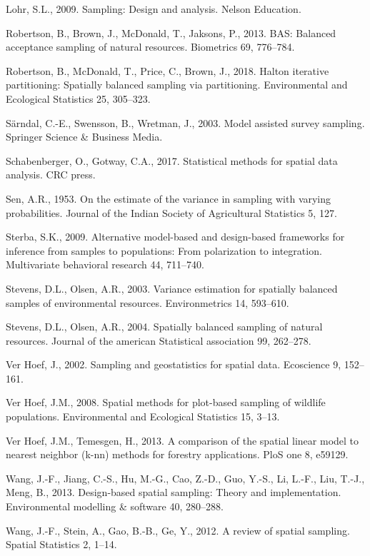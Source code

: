 \documentclass[]{elsarticle} %
\begin{document}
\leavevmode\hypertarget{ref-lohr2009sampling}{}%
Lohr, S.L., 2009. Sampling: Design and analysis. Nelson Education.

\leavevmode\hypertarget{ref-robertson2013bas}{}%
Robertson, B., Brown, J., McDonald, T., Jaksons, P., 2013. BAS: Balanced
acceptance sampling of natural resources. Biometrics 69, 776--784.

\leavevmode\hypertarget{ref-robertson2018halton}{}%
Robertson, B., McDonald, T., Price, C., Brown, J., 2018. Halton
iterative partitioning: Spatially balanced sampling via partitioning.
Environmental and Ecological Statistics 25, 305--323.

\leavevmode\hypertarget{ref-sarndal2003model}{}%
Särndal, C.-E., Swensson, B., Wretman, J., 2003. Model assisted survey
sampling. Springer Science \& Business Media.

\leavevmode\hypertarget{ref-schabenberger2017statistical}{}%
Schabenberger, O., Gotway, C.A., 2017. Statistical methods for spatial
data analysis. CRC press.

\leavevmode\hypertarget{ref-sen1953estimate}{}%
Sen, A.R., 1953. On the estimate of the variance in sampling with
varying probabilities. Journal of the Indian Society of Agricultural
Statistics 5, 127.

\leavevmode\hypertarget{ref-sterba2009alternative}{}%
Sterba, S.K., 2009. Alternative model-based and design-based frameworks
for inference from samples to populations: From polarization to
integration. Multivariate behavioral research 44, 711--740.

\leavevmode\hypertarget{ref-stevens2003variance}{}%
Stevens, D.L., Olsen, A.R., 2003. Variance estimation for spatially
balanced samples of environmental resources. Environmetrics 14,
593--610.

\leavevmode\hypertarget{ref-stevens2004spatially}{}%
Stevens, D.L., Olsen, A.R., 2004. Spatially balanced sampling of natural
resources. Journal of the american Statistical association 99, 262--278.

\leavevmode\hypertarget{ref-verhoef2002sampling}{}%
Ver Hoef, J., 2002. Sampling and geostatistics for spatial data.
Ecoscience 9, 152--161.

\leavevmode\hypertarget{ref-verhoef2008spatial}{}%
Ver Hoef, J.M., 2008. Spatial methods for plot-based sampling of
wildlife populations. Environmental and Ecological Statistics 15, 3--13.

\leavevmode\hypertarget{ref-ver2013comparison}{}%
Ver Hoef, J.M., Temesgen, H., 2013. A comparison of the spatial linear
model to nearest neighbor (k-nn) methods for forestry applications. PloS
one 8, e59129.

\leavevmode\hypertarget{ref-wang2013design}{}%
Wang, J.-F., Jiang, C.-S., Hu, M.-G., Cao, Z.-D., Guo, Y.-S., Li, L.-F.,
Liu, T.-J., Meng, B., 2013. Design-based spatial sampling: Theory and
implementation. Environmental modelling \& software 40, 280--288.

\leavevmode\hypertarget{ref-wang2012review}{}%
Wang, J.-F., Stein, A., Gao, B.-B., Ge, Y., 2012. A review of spatial
sampling. Spatial Statistics 2, 1--14.
\end{document}
